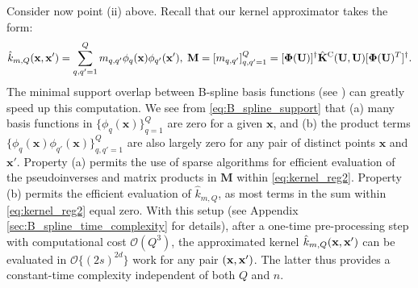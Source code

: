 \documentclass[aos,preprint]{imsart}
\theoremstyle{plain}
\newcommand{\BFx}{\bold x}
\newcommand{\BU}{\bold U}
\newcommand{\BK}{\bold K}
\newcommand{\BPhi}{\boldsymbol{\Phi}}
\newcommand{\cmtS}[1]{{\color{red}{(Simon: #1)}}}
\theoremstyle{remark}
\begin{document}



Consider now point (ii) above. Recall that our kernel approximator takes the form:
\begin{equation}
\label{eq:kernel_reg2}
 \hat{k}_{m,Q}(\BFx, \BFx') = \sum_{q,q'=1}^Q m_{q,q'}{\phi}_q(\BFx) {\phi}_{q'}(\BFx'), \; \mathbf{M} = [m_{q,q'}]_{q,q'=1}^Q = [\BPhi(\BU)]^\dagger \hat{\BK}^{\rm C}(\BU, \BU) [\BPhi(\BU)^T]^\dagger.
\end{equation}
The minimal support overlap between B-spline basis functions (see \cite{hollig2003finite}) can greatly speed up this computation. We see from \eqref{eq:B_spline_support} that (a) many basis functions in $\{\phi_q(\mathbf{x})\}_{q=1}^Q$ are zero for a given $\mathbf{x}$, and (b) the product terms $\{\phi_q(\mathbf{x})\phi_{q'}(\mathbf{x})\}_{q,q'=1}^Q$ are also largely zero for any pair of distinct points $\mathbf{x}$ and $\mathbf{x}'$. Property (a) permits the use of sparse algorithms \citep{ding2020generalization,ding2024sample} for efficient evaluation of the pseudoinverses and matrix products in $\mathbf{M}$ within \eqref{eq:kernel_reg2}. Property (b) permits the efficient evaluation of $\hat{k}_{m,Q}$, as most terms in the sum within \eqref{eq:kernel_reg2} equal zero. With this setup (see Appendix \ref{sec:B_spline_time_complexity} for details), after a one-time pre-processing step with computational cost $\mathcal{O}(Q^3)$, the approximated kernel $\hat{k}_{m,Q}(\BFx,\BFx')$ can be evaluated in $\mathcal{O}\{(2s)^{2d}\}$ work for any pair $(\BFx, \BFx')$. The latter thus provides a constant-time complexity independent of both $Q$ and $n$.
\end{document}
